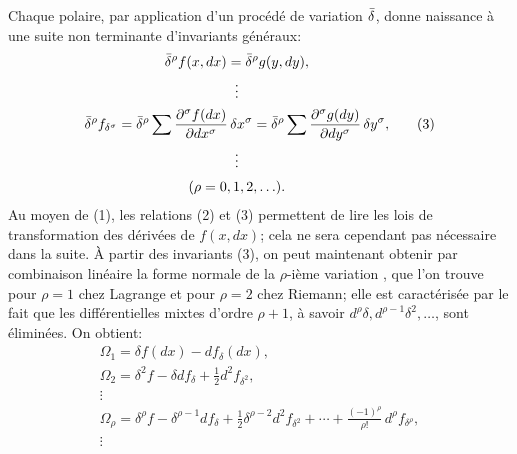 Chaque polaire, par application d'un procédé de variation \(\bar{\delta}\),
donne naissance à une suite non terminante d'invariants généraux:
\begin{equation}
\begin{gathered}
\bar{\delta}^\rho f(x,dx)=\bar{\delta}^\rho g(y,dy),\\
\vdots\\
\bar{\delta}^\rho f_{\delta^\sigma}
=\bar{\delta}^\rho\sum\frac{\partial^\sigma f(dx)}{\partial dx^\sigma}\,
\delta x^\sigma
=\bar{\delta}^\rho\sum\frac{\partial^\sigma g(dy)}{\partial dy^\sigma}\,
\delta y^\sigma,\\
\vdots\\[0.2em]
(\rho=0,1,2,\ldots).
\end{gathered}
\tag{3}
\end{equation}
Au moyen de (1), les relations (2) et (3) permettent de lire les lois de
transformation des dérivées de \(f(x,dx)\); cela ne sera cependant pas
nécessaire dans la suite. À partir des invariants (3), on peut maintenant
obtenir par combinaison linéaire la \og{} forme normale de la \(\rho\)-ième
variation \fg{}, que l'on trouve pour \(\rho=1\) chez Lagrange et pour
\(\rho=2\) chez Riemann; elle est caractérisée par le fait que les
différentielles mixtes d'ordre \(\rho+1\), à savoir
\(d^\rho\delta,d^{\rho-1}\delta^2,\ldots\), sont éliminées. On obtient:
\begin{equation}
\begin{gathered}
\Omega_1=\delta f(dx)-d f_\delta(dx),\\
\Omega_2=\delta^2 f-\delta d f_\delta+\frac12 d^2 f_{\delta^2},\\
\vdots\\
\Omega_\rho=\delta^\rho f-\delta^{\rho-1}d f_\delta
+\frac12\delta^{\rho-2}d^2 f_{\delta^2}
+\cdots+\frac{(-1)^\rho}{\rho!}\,d^\rho f_{\delta^\rho},\\
\vdots
\end{gathered}
\tag{4}
\end{equation}

